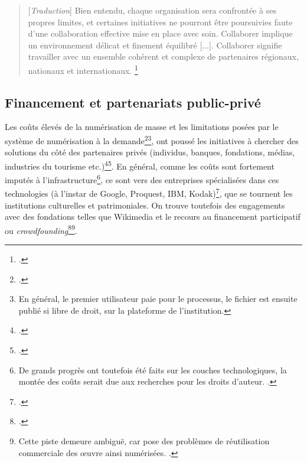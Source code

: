 \begin{quotation}
[\textit{Traduction}]
Bien entendu, chaque organisation sera confrontée à ses propres limites, et certaines initiatives ne pourront être poursuivies faute d'une collaboration effective mise en place avec soin. Collaborer implique un environnement délicat et finement équilibré [...]. Collaborer signifie travailler avec un ensemble cohérent et complexe de partenaires régionaux, nationaux et internationaux.
\footnote{\cite[p.26]{coutts_stepping_2017}.}
\end{quotation}

\subsection{Financement et partenariats public-privé}

Les coûts élevés de la numérisation de masse et les limitations posées par le système de numérisation à la demande\footcite{maurel_quel_2017}\footnote{En général, le premier utilisateur paie pour le processus, le fichier est ensuite publié si libre de droit, sur la plateforme de l'institution.}, ont poussé les initiatives à chercher des solutions du côté des partenaires privés (individus, banques, fondations, médias, industries du tourisme etc.)\footcite{lopatin_library_2006}\footcite{yeates_collaborative_2006}. En général, comme les coûts sont fortement imputés à l'infrastructure\footnote{De grands progrès ont toutefois été faits sur les couches technologiques, la montée des coûts serait due aux recherches pour les droits d'auteur. \cite{stobo_i_2018}.}, ce sont vers des entreprises spécialisées dans ces technologies (à l'instar de Google, Proquest, IBM, Kodak)\footcite{dufrene_numerisation_2013}, que se tournent les institutions culturelles et patrimoniales. On trouve toutefois des engagements avec des fondations telles que Wikimedia et le recours au financement participatif ou \textit{crowdfounding}\footcite{noauthor_european_2019}\footnote{Cette piste demeure ambiguë, car pose des problèmes de réutilisation commerciale des \oe{}uvre ainsi numérisées. \cite{maurel_quel_2017}.}. 

